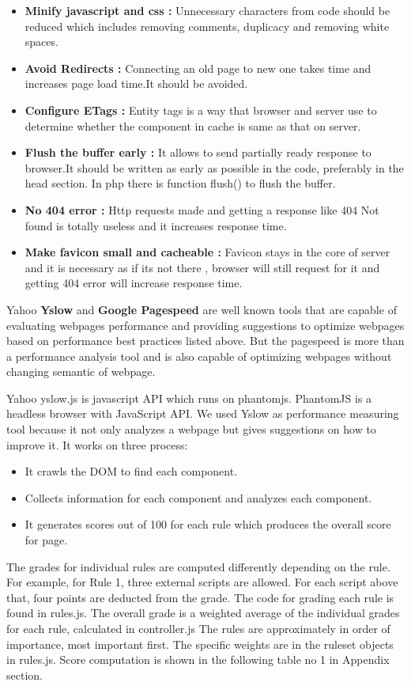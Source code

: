 \documentclass[conference]{IEEEtran}
\begin{document}
\begin{itemize}
\item \textbf{ Minify javascript and css :}
Unnecessary characters from code should be reduced which includes removing
comments, duplicacy and removing white spaces.

\item \textbf{Avoid Redirects :}
Connecting an old page to new one takes time  and increases page load time.It
should be avoided.

\item \textbf{Configure ETags :}
Entity tags is a way that browser and server use to determine whether the
component in cache is same as that on server.

\item \textbf{Flush the buffer early :}
It allows to send partially ready response to browser.It should be written as
early as possible in the code, preferably in the head section.
In php there is function flush() to flush the buffer. 

\item \textbf{No 404 error :}
Http requests made and getting a response like 404 Not found is totally useless
and it increases response time.

\item \textbf{Make favicon small and cacheable :}
Favicon stays in the core of server and  it is necessary as if its not there ,
browser will still request for it and getting 404 error will increase response
time.
\end{itemize}

Yahoo {\bf Yslow} and {\bf Google Pagespeed} are well known tools that are capable of
evaluating webpages performance and providing suggestions to optimize webpages
based on performance best practices listed above. But the pagespeed is more than a performance analysis
tool and is also capable of optimizing webpages without changing semantic of webpage.

Yahoo yslow.js is javascript API which runs on phantomjs. PhantomJS is a
headless browser with JavaScript API. We used Yslow as performance measuring
tool because it not only analyzes a webpage but gives suggestions on how to
improve it.
It works on three process:
\begin{itemize}
\item It crawls the DOM to find each component.
\item Collects information for each component and analyzes each component.
\item It generates scores out of 100 for each rule which produces the overall
score for page.
\end{itemize}
The grades for individual rules are computed differently depending on the rule.
For example, for Rule 1, three external scripts are allowed. For each script
above that, four points are deducted from the grade. The code for grading each
rule is found in rules.js. The overall grade is a weighted average of the
individual grades for each rule, calculated in controller.js The rules are
approximately in order of importance, most important first. The specific weights
are in the ruleset objects in rules.js. Score computation is shown in
the following table no 1 in Appendix section.
\end{document}
